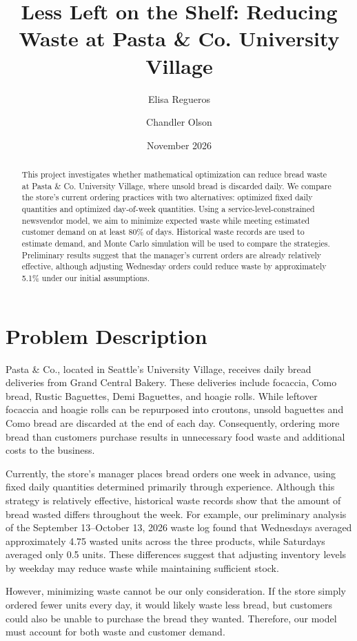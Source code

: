 \documentclass[11pt]{article}
\title{\textbf{Less Left on the Shelf: Reducing Waste at Pasta \& Co. University Village}}
\author{Elisa Regueros \and Chandler Olson}
\date{November 2026}
\begin{document}
\maketitle

\begin{abstract}
This project investigates whether mathematical optimization can reduce bread waste at Pasta \& Co. University Village, where unsold bread is discarded daily. We compare the store's current ordering practices with two alternatives: optimized fixed daily quantities and optimized day-of-week quantities. Using a service-level-constrained newsvendor model, we aim to minimize expected waste while meeting estimated customer demand on at least 80\% of days. Historical waste records are used to estimate demand, and Monte Carlo simulation will be used to compare the strategies. Preliminary results suggest that the manager's current orders are already relatively effective, although adjusting Wednesday orders could reduce waste by approximately 5.1\% under our initial assumptions.
\end{abstract}

\section{Problem Description}

Pasta \& Co., located in Seattle's University Village, receives daily bread deliveries from Grand Central Bakery. These deliveries include focaccia, Como bread, Rustic Baguettes, Demi Baguettes, and hoagie rolls. While leftover focaccia and hoagie rolls can be repurposed into croutons, unsold baguettes and Como bread are discarded at the end of each day. Consequently, ordering more bread than customers purchase results in unnecessary food waste and additional costs to the business.

Currently, the store's manager places bread orders one week in advance, using fixed daily quantities determined primarily through experience. Although this strategy is relatively effective, historical waste records show that the amount of bread wasted differs throughout the week. For example, our preliminary analysis of the September 13--October 13, 2026 waste log found that Wednesdays averaged approximately 4.75 wasted units across the three products, while Saturdays averaged only 0.5 units. These differences suggest that adjusting inventory levels by weekday may reduce waste while maintaining sufficient stock.

However, minimizing waste cannot be our only consideration. If the store simply ordered fewer units every day, it would likely waste less bread, but customers could also be unable to purchase the bread they wanted. Therefore, our model must account for both waste and customer demand.
\end{document}
